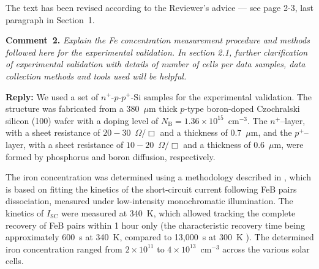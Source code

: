 \documentclass[a4paper,fleqn]{cas-sc}
\begin{document}
The text has been revised according to the Reviewer's advice --- see page 2-3, last paragraph in Section~1.





\vspace{1cm}
\noindent
\textcolor[rgb]{0.00,0.50,1.00}{\textbf{Comment~2.}}
\emph{Explain the Fe concentration measurement procedure and methods followed here for the experimental validation.
In section 2.1, further clarification of experimental validation with details of number of cells per data samples, data collection methods and tools used will be helpful.}

\noindent
\textcolor[rgb]{0.51,0.00,0.00}{\textbf{Reply:}}
We used a set of $n^+$-$p$-$p^+$-Si samples for the experimental validation.
The structure was fabricated from a 380~$\mu$m thick $p$-type boron-doped Czochralski silicon (100) wafer
with a doping level of $N_\mathrm{B}=1.36\times10^{15}$~cm$^{-3}$.
The $n^+$--layer, with a sheet resistance of $20-30$~$\Omega/\Box$ and a thickness of $0.7$~$\mu$m,
and the $p^+$--layer, with a sheet resistance of $10-20$~$\Omega/\Box$ and a thickness of $0.6$~$\mu$m,
were formed by phosphorus and boron diffusion, respectively.

The iron concentration was determined using a methodology described in \cite{Olikh2022:JMatSci,Olikh2021JAP},
which is based on fitting the kinetics of the short-circuit current following FeB pairs dissociation,
measured under low-intensity monochromatic illumination.
The kinetics of $I_\mathrm{SC}$ were measured at 340~K, which allowed tracking the complete recovery of FeB pairs within 1 hour only
(the characteristic recovery time being approximately 600~s at 340~K, compared to 13,000~s at 300~K \cite{FeBAssJAP2014,FeBKin2019}).
The determined iron concentration ranged from $2\times10^{11}$ to $4\times10^{13}$~cm$^{-3}$ across the various solar cells.
\end{document}
